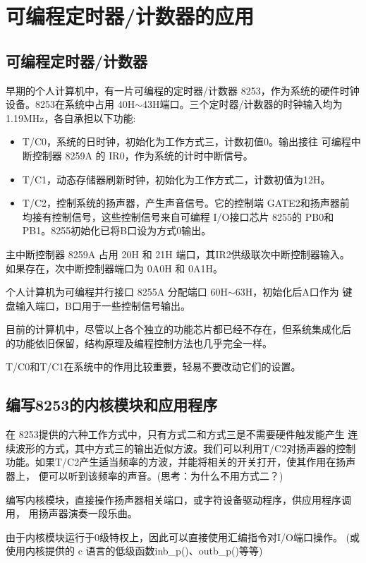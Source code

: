 \section{可编程定时器/计数器的应用}
\subsection{可编程定时器/计数器}
    早期的个人计算机中，有一片可编程的定时器/计数器 8253，作为系统的硬件时钟
设备。8253在系统中占用 40H$\sim$43H端口。三个定时器/计数器的时钟输入均为
1.19MHz，各自承担以下功能:
\begin{itemize}\itemsep=-3pt
  \item T/C0，系统的日时钟，初始化为工作方式三，计数初值0。输出接往
        可编程中断控制器 8259A 的 IR0，作为系统的计时中断信号。
  \item T/C1，动态存储器刷新时钟，初始化为工作方式二，计数初值为12H。
  \item T/C2，控制系统的扬声器，产生声音信号。它的控制端 GATE2和扬声器前
        均接有控制信号，这些控制信号来自可编程 I/O接口芯片 8255的
        PB0和 PB1。8255初始化已将B口设为方式0输出。
\end{itemize}

    主中断控制器 8259A 占用 20H 和 21H 端口，其IR2供级联次中断控制器输入。
如果存在，次中断控制器端口为 0A0H 和 0A1H。

    个人计算机为可编程并行接口 8255A 分配端口 60H$\sim$63H，初始化后A口作为
键盘输入端口，B口用于一些控制信号输出。

    目前的计算机中，尽管以上各个独立的功能芯片都已经不存在，但系统集成化后
的功能依旧保留，结构原理及编程控制方法也几乎完全一样。

    T/C0和T/C1在系统中的作用比较重要，轻易不要改动它们的设置。

\subsection{编写8253的内核模块和应用程序}
    在 8253提供的六种工作方式中，只有方式二和方式三是不需要硬件触发能产生
连续波形的方式，其中方式三的输出近似方波。我们可以利用T/C2对扬声器的控制
功能。如果T/C2产生适当频率的方波，并能将相关的开关打开，使其作用在扬声器上，
便可以听到该频率的声音。(思考：为什么不用方式二？)

    编写内核模块，直接操作扬声器相关端口，或字符设备驱动程序，供应用程序调用，
用扬声器演奏一段乐曲。

    由于内核模块运行于0级特权上，因此可以直接使用汇编指令对I/O端口操作。
(或使用内核提供的 c 语言的低级函数inb\_p()、outb\_p()等等)

